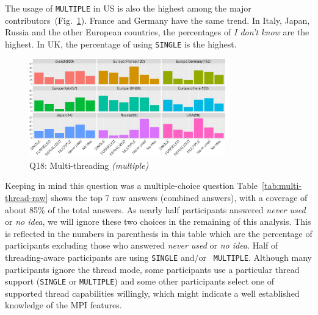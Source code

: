 \documentclass[preprint,5p,times]{elsarticle}
\def\myquote#1{{\it #1}}
\def\mcountries{major contributors\xspace{}}%
\begin{document}
The usage of {\tt MULTIPLE} in US is also the highest among the
\mcountries\  (Fig.~\ref{fig:multi-thread}). France and Germany have
the same trend. In Italy, Japan, Russia and the
other European countries, the percentages of \myquote{I don't know}
are the highest. In UK, the percentage of using {\tt SINGLE} is the
highest.

\begin{figure}[htb]
  \begin{center}
    \includegraphics[width=8.5cm]{R-scripts/Q18.pdf}
    \caption{Q18: Multi-threading {\it(multiple)}}
    \label{fig:multi-thread}
  \end{center}
\end{figure}

Keeping in mind this question was a multiple-choice question
Table~\ref{tab:multi-thread-raw} shows the top 7 raw answers (combined answers),
with a coverage of about 85\% of the total answers.
As nearly half participants answered \myquote{never used} or \myquote{no idea},
we will ignore these two choices in the remaining of this analysis. This is
reflected in the numbers in parenthesis in this table which are the percentage
of participants excluding those who answered \myquote{never used} or \myquote{no
idea}. Half of threading-aware participants are using {\tt SINGLE} and/or {\tt
MULTIPLE}. Although many participants ignore the thread mode, some participants
use a particular thread support ({\tt SINGLE} or {\tt MULTIPLE}) and some other
participants select one of supported thread capabilities willingly, which might
indicate a well established knowledge of the MPI features.
\end{document}
